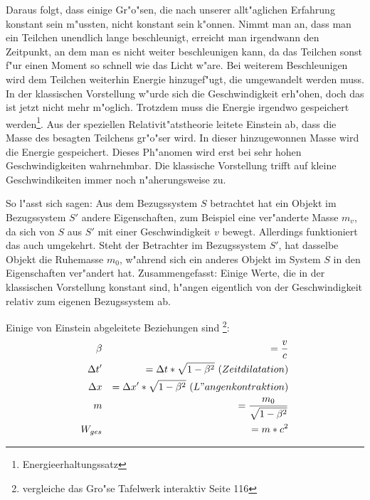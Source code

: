 \documentclass[14pt, a4paper]{report}
\begin{document}
Daraus folgt, dass einige Gr"o"sen, die nach unserer allt"aglichen Erfahrung konstant
sein m"ussten, nicht konstant sein k"onnen. Nimmt man an, dass man ein Teilchen 
unendlich lange beschleunigt, erreicht man irgendwann den Zeitpunkt, an dem man es nicht weiter
beschleunigen kann, da das Teilchen sonst f"ur einen Moment so schnell wie das Licht 
w"are. Bei weiterem Beschleunigen wird dem Teilchen weiterhin Energie hinzugef"ugt, die 
umgewandelt werden muss. In der klassischen Vorstellung 
w"urde sich die Geschwindigkeit erh"ohen, doch das ist jetzt nicht mehr m"oglich. 
Trotzdem muss die Energie irgendwo gespeichert werden\footnote{Energieerhaltungssatz}. 
Aus der speziellen Relativit"atstheorie leitete Einstein ab, dass die Masse des besagten
Teilchens gr"o"ser wird. In dieser hinzugewonnen Masse wird die Energie gespeichert.
Dieses Ph"anomen wird erst bei sehr hohen Geschwindigkeiten wahrnehmbar. Die klassische 
Vorstellung trifft auf kleine Geschwindikeiten immer noch n"aherungsweise zu.

So l"asst sich sagen: Aus dem Bezugssystem $S$ betrachtet hat 
ein Objekt im Bezugssystem $S'$ andere Eigenschaften, zum Beispiel eine ver"anderte 
Masse $m_v$, da sich von $S$ aus $S'$ mit einer Geschwindigkeit $v$ bewegt. 
Allerdings funktioniert das auch umgekehrt. Steht der Betrachter im Bezugssystem $S'$,
hat dasselbe Objekt die Ruhemasse $m_0$, w"ahrend sich ein anderes Objekt im System $S$ 
in den Eigenschaften ver"andert hat. Zusammengefasst: Einige Werte, die in der 
klassischen Vorstellung konstant sind, h"angen eigentlich von der Geschwindigkeit 
relativ zum eigenen Bezugssystem ab.

Einige von Einstein abgeleitete Beziehungen sind 
\footnote{vergleiche das Gro"se Tafelwerk interaktiv Seite 116 }:
\begin{eqnarray}
\beta && = \frac{v}{c} \\
\Delta t' && = \Delta t * \sqrt{1 - \beta^2} ~ (Zeitdilatation) \\
\Delta x && = \Delta x' * \sqrt{1 - \beta^2} ~ (L"angenkontraktion) \\
m && = \frac{m_0}{\sqrt{1 - \beta^2}} \label{var_m} \\
W_{ges} && = m * c^2 \label{mc_square}
\end{eqnarray}
\end{document}
